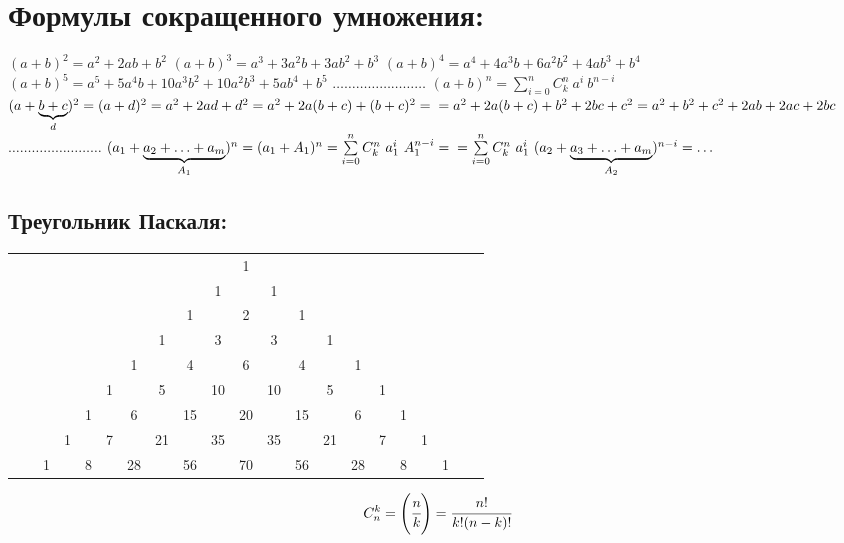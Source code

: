 \documentclass[12pt, a4paper]{article}
\begin{document}
\section{Формулы сокращенного умножения:}
$(a+b)^2 = a^2+2ab+b^2$ \newline
$(a+b)^3 = a^3+3a^2b+3ab^2+b^3$ \newline
$(a+b)^4 = a^4+4a^3b+6a^2b^2+4ab^3+b^4$ \newline
$(a+b)^5 = a^5+5a^4b+10a^3b^2+10a^2b^3+5ab^4+b^5$ \newline
$\ldots\ldots\ldots\ldots\ldots\ldots\ldots\ldots$ \newline
$(a+b)^n = \sum\limits_{i=0}^{n}{C_k^n\ a^i\ b^{n-i}} $ \\ \newline
$(a+\underbrace{b+c}_{d})^2 = (a+d)^2 = a^2+2ad+d^2 = a^2+2a(b+c)+(b+c)^2 = \\ = a^2+2a(b+c)+b^2+2bc+c^2 = a^2+b^2+c^2+2ab+2ac+2bc$ \newline
$\ldots\ldots\ldots\ldots\ldots\ldots\ldots\ldots$ \newline
$(a_1+\underbrace{a_2+\ldots+a_m}_{A_1})^n = (a_1+A_1)^n = \sum\limits_{i=0}^{n}{C_k^n\ a_1^i\ A_1^{n-i}} =
\\ = \sum\limits_{i=0}^{n}{C_k^n\ a_1^i\ (a_2+\underbrace{a_3+\ldots+a_m}_{A_2})^{n-i}} = \ldots $
\subsection{Треугольник Паскаля:}
\begin{center}
\begin{tabular}{ccccccccccccccccccccc}
 &  &  &  &  &  &  &  &  &  & 1  &  &  &  &  &  &  &  &  &  &  \\ 
 &  &  &  &  &  &  &  &  & 1  &  & 1  &  &  &  &  &  &  &  &  &  \\ 
 &  &  &  &  &  &  &  & 1  &  & 2  &  & 1  &  &  &  &  &  &  &  &  \\ 
 &  &  &  &  &  &  & 1  &  & 3  &  & 3  &  & 1  &  &  &  &  &  &  &  \\ 
 &  &  &  &  &  & 1  &  & 4  &  & 6  &  & 4  &  & 1  &  &  &  &  &  &  \\ 
 &  &  &  &  & 1  &  & 5  &  & 10  &  & 10  &  & 5  &  & 1  &  &  &  &  &  \\ 
 &  &  &  & 1  &  & 6  &  & 15  &  & 20  &  & 15  &  & 6  &  & 1  &  &  &  &  \\ 
 &  &  & 1  &  & 7  &  & 21  &  & 35  &  & 35  &  & 21  &  & 7  &  & 1  &  &  &  \\ 
 &  & 1  &  & 8  &  & 28  &  & 56  &  & 70  &  & 56  &  & 28  &  & 8  &  & 1  &  &  \\ 
\end{tabular}
\end{center}
$$ C_n^k = \left( \cfrac{n}{k} \right) = \cfrac{n!}{k!(n-k)!} $$
\newpage
\end{document}
